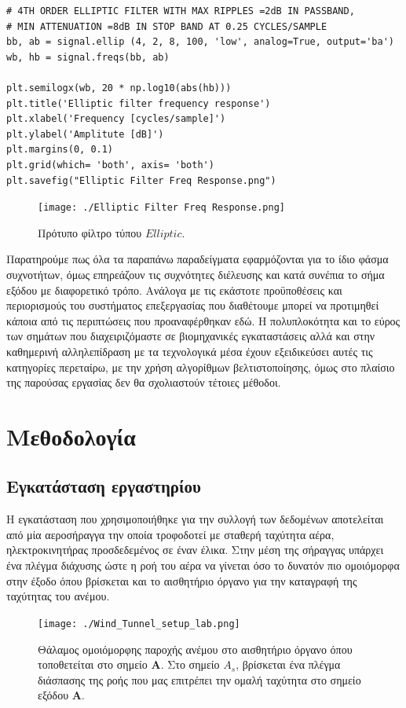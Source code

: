 \documentclass[breaklines=true, 12pt]{article}
\begin{document}
{{{
\begin{verbatim}
# 4TH ORDER ELLIPTIC FILTER WITH MAX RIPPLES =2dB IN PASSBAND,
# MIN ATTENUATION =8dB IN STOP BAND AT 0.25 CYCLES/SAMPLE
bb, ab = signal.ellip (4, 2, 8, 100, 'low', analog=True, output='ba')
wb, hb = signal.freqs(bb, ab)

plt.semilogx(wb, 20 * np.log10(abs(hb)))
plt.title('Elliptic filter frequency response')
plt.xlabel('Frequency [cycles/sample]')
plt.ylabel('Amplitute [dB]')
plt.margins(0, 0.1)
plt.grid(which= 'both', axis= 'both')
plt.savefig("Elliptic Filter Freq Response.png")
\end{verbatim}

\begin{figure}[htbp]
\centering
\texttt{[image: ./Elliptic Filter Freq Response.png]}
\caption{Πρότυπο φίλτρο τύπου \(Elliptic\).}
\end{figure}

Παρατηρούμε πως όλα τα παραπάνω παραδείγματα εφαρμόζονται για το ίδιο φάσμα
συχνοτήτων, όμως επηρεάζουν τις συχνότητες διέλευσης και κατά συνέπια το
σήμα εξόδου με διαφορετικό τρόπο. Ανάλογα με τις εκάστοτε προϋποθέσεις και
περιορισμούς του συστήματος επεξεργασίας που διαθέτουμε μπορεί να προτιμηθεί
κάποια από τις περιπτώσεις που προαναφέρθηκαν εδώ. Η πολυπλοκότητα και το εύρος
των σημάτων που διαχειριζόμαστε σε βιομηχανικές εγκαταστάσεις αλλά και στην
καθημερινή αλληλεπίδραση με τα τεχνολογικά μέσα έχουν εξειδικεύσει αυτές τις
κατηγορίες περεταίρω, με την χρήση αλγορίθμων βελτιστοποίησης, όμως στο πλαίσιο
της παρούσας εργασίας δεν θα σχολιαστούν τέτοιες μέθοδοι.
\section{Μεθοδολογία}
\label{sec:org10f3577}
\subsection{Εγκατάσταση εργαστηρίου}
\label{sec:orgc4e8d60}
    Η εγκατάσταση που χρησιμοποιήθηκε για την συλλογή των δεδομένων
αποτελείται από μία αεροσήραγγα την οποία τροφοδοτεί με σταθερή ταχύτητα
αέρα, ηλεκτροκινητήρας προσδεδεμένος σε έναν έλικα. Στην μέση της
σήραγγας υπάρχει ένα πλέγμα διάχυσης ώστε η ροή του αέρα να γίνεται όσο
το δυνατόν πιο ομοιόμορφα στην έξοδο όπου βρίσκεται και το αισθητήριο
όργανο για την καταγραφή της ταχύτητας του ανέμου.

\begin{figure}[htbp]
\centering
\texttt{[image: ./Wind\_Tunnel\_setup\_lab.png]}
\caption{Θάλαμος ομοιόμορφης παροχής ανέμου στο αισθητήριο όργανο όπου τοποθετείται στο σημείο \textbf{Α}. Στο σημείο  \textbf{\(A_{s}\)}, βρίσκεται ένα πλέγμα διάσπασης της ροής που μας επιτρέπει την ομαλή ταχύτητα στο σημείο εξόδου \textbf{A}.}
\end{figure}

}}}
\end{document}
